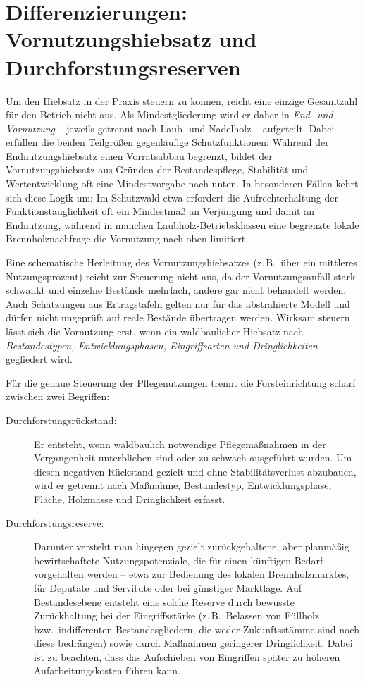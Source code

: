 \documentclass[twocolumn, paper=a4, fontsize=10pt]{scrartcl}
\begin{document}
\section{Differenzierungen: Vornutzungshiebsatz und Durchforstungsreserven}

Um den Hiebsatz in der Praxis steuern zu können, reicht eine einzige Gesamtzahl für den Betrieb nicht aus. Als Mindestgliederung wird er daher in \emph{End- und Vornutzung} -- jeweils getrennt nach Laub- und Nadelholz -- aufgeteilt. Dabei erfüllen die beiden Teilgrößen gegenläufige Schutzfunktionen: Während der Endnutzungshiebsatz einen Vorratsabbau begrenzt, bildet der Vornutzungshiebsatz aus Gründen der Bestandespflege, Stabilität und Wertentwicklung oft eine Mindestvorgabe nach unten. In besonderen Fällen kehrt sich diese Logik um: Im Schutzwald etwa erfordert die Aufrechterhaltung der Funktionstauglichkeit oft ein Mindestmaß an Verjüngung und damit an Endnutzung, während in manchen Laubholz-Betriebsklassen eine begrenzte lokale Brennholznachfrage die Vornutzung nach oben limitiert.

Eine schematische Herleitung des Vornutzungshiebsatzes (z.\,B.\ über ein mittleres Nutzungsprozent) reicht zur Steuerung nicht aus, da der Vornutzungsanfall stark schwankt und einzelne Bestände mehrfach, andere gar nicht behandelt werden. Auch Schätzungen aus Ertragstafeln gelten nur für das abstrahierte Modell und dürfen nicht ungeprüft auf reale Bestände übertragen werden. Wirksam steuern lässt sich die Vornutzung erst, wenn ein waldbaulicher Hiebsatz nach \emph{Bestandestypen, Entwicklungsphasen, Eingriffsarten und Dringlichkeiten} gegliedert wird.

Für die genaue Steuerung der Pflegenutzungen trennt die Forsteinrichtung scharf zwischen zwei Begriffen:

\begin{description}
\item[Durchforstungsrückstand:] Er entsteht, wenn waldbaulich notwendige Pflegemaßnahmen in der Vergangenheit unterblieben sind oder zu schwach ausgeführt wurden. Um diesen negativen Rückstand gezielt und ohne Stabilitätsverlust abzubauen, wird er getrennt nach Maßnahme, Bestandestyp, Entwicklungsphase, Fläche, Holzmasse und Dringlichkeit erfasst.
\item[Durchforstungsreserve:] Darunter versteht man hingegen gezielt zurückgehaltene, aber planmäßig bewirtschaftete Nutzungspotenziale, die für einen künftigen Bedarf vorgehalten werden -- etwa zur Bedienung des lokalen Brennholzmarktes, für Deputate und Servitute oder bei günstiger Marktlage. Auf Bestandesebene entsteht eine solche Reserve durch bewusste Zurückhaltung bei der Eingriffsstärke (z.\,B.\ Belassen von Füllholz bzw.\ indifferenten Bestandesgliedern, die weder Zukunftsstämme sind noch diese bedrängen) sowie durch Maßnahmen geringerer Dringlichkeit. Dabei ist zu beachten, dass das Aufschieben von Eingriffen später zu höheren Aufarbeitungskosten führen kann.
\end{description}
\end{document}
